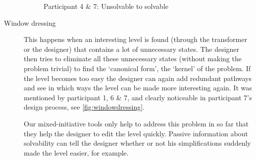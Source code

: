 \begin{description}
\begin{figure}[!htbp]
\begin{minipage}{0.5\textwidth}
\end{minipage}
\caption{Participant 4 \& 7: Unsolvable to solvable}
\end{figure}

\item[Window dressing] This happens when an interesting level is found (through the transformer or the designer) that contains a lot of unnecessary states. The designer then tries to eliminate all these unnecessary states (without making the problem trivial) to find the `canonical form', the `kernel' of the problem. If the level becomes too easy the designer can again add redundant pathways and see in which ways the level can be made more interesting again. It was mentioned by participant 1, 6 \& 7, and clearly noticeable in participant 7's design process, see \autoref{fig:windowdressing}.

Our mixed-initiative tools only help to address this problem in so far that they help the designer to edit the level quickly. Passive information about solvability can tell the designer whether or not his simplifications suddenly made the level easier, for example.


\end{description}
